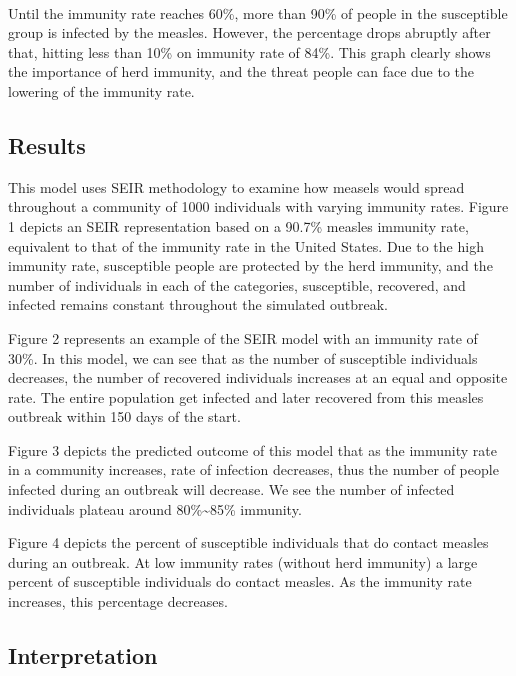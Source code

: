 \documentclass[11pt]{article}
\begin{document}
    \begin{center}
    \end{center}
    { \hspace*{\fill} \\}
    
    Until the immunity rate reaches 60\%, more than 90\% of people in the
susceptible group is infected by the measles. However, the percentage
drops abruptly after that, hitting less than 10\% on immunity rate of
84\%. This graph clearly shows the importance of herd immunity, and the
threat people can face due to the lowering of the immunity rate.

    \hypertarget{results}{%
\subsection{Results}\label{results}}

This model uses SEIR methodology to examine how measels would spread
throughout a community of 1000 individuals with varying immunity rates.
Figure 1 depicts an SEIR representation based on a 90.7\% measles
immunity rate, equivalent to that of the immunity rate in the United
States. Due to the high immunity rate, susceptible people are protected
by the herd immunity, and the number of individuals in each of the
categories, susceptible, recovered, and infected remains constant
throughout the simulated outbreak.

Figure 2 represents an example of the SEIR model with an immunity rate
of 30\%. In this model, we can see that as the number of susceptible
individuals decreases, the number of recovered individuals increases at
an equal and opposite rate. The entire population get infected and later
recovered from this measles outbreak within 150 days of the start.

Figure 3 depicts the predicted outcome of this model that as the
immunity rate in a community increases, rate of infection decreases,
thus the number of people infected during an outbreak will decrease. We
see the number of infected individuals plateau around
80\%\textasciitilde{}85\% immunity.

Figure 4 depicts the percent of susceptible individuals that do contact
measles during an outbreak. At low immunity rates (without herd
immunity) a large percent of susceptible individuals do contact measles.
As the immunity rate increases, this percentage decreases.

    \hypertarget{interpretation}{%
\subsection{Interpretation}\label{interpretation}}
\end{document}
